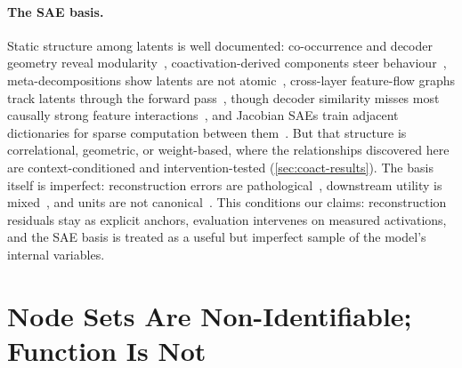 \documentclass[10pt]{article}
\begin{document}
\paragraph{The SAE basis.}
Static structure among latents is well documented: co-occurrence and decoder geometry reveal modularity~\citep{li2025geometry}, coactivation-derived components steer behaviour~\citep{deng2026coactivation}, meta-decompositions show latents are not atomic~\citep{leask2025canonical}, cross-layer feature-flow graphs track latents through the forward pass~\citep{laptev2025feature}, though decoder similarity misses most causally strong feature interactions~\citep{droste2026decoder}, and Jacobian SAEs train adjacent dictionaries for sparse computation between them~\citep{farnik2025jacobian}.
But that structure is correlational, geometric, or weight-based, where the relationships discovered here are context-conditioned and intervention-tested (\cref{sec:coact-results}).
The basis itself is imperfect: reconstruction errors are pathological~\citep{gurnee2024pathological}, downstream utility is mixed~\citep{smith2025negative}, and units are not canonical~\citep{leask2025canonical}.
This conditions our claims: reconstruction residuals stay as explicit anchors, evaluation intervenes on measured activations, and the SAE basis is treated as a useful but imperfect sample of the model's internal variables.

\section{Node Sets Are Non-Identifiable; Function Is Not}
\label{app:underdetermination}
\label{sec:underdetermination}
\end{document}
